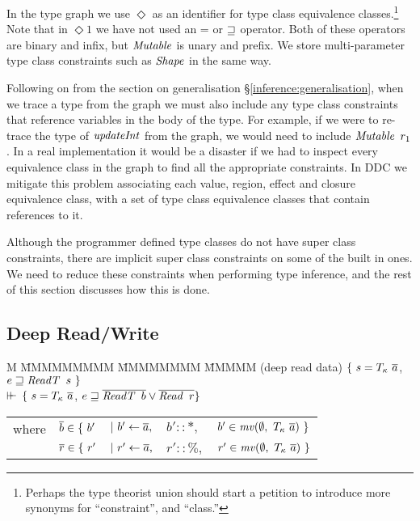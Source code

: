 In the type graph we use $\Diamond$ as an identifier for type class equivalence classes.\footnote{Perhaps the type theorist union should start a petition to introduce more synonyms for ``constraint'', and ``class.''} Note that in $\Diamond1$ we have not used an = or $\sqsupseteq$ operator. Both of these operators are binary and infix, but $\operatorname{\mathit{Mutable}}$ is unary and prefix. We store multi-parameter type class constraints such as $\operatorname{\mathit{Shape}}$ in the same way.

Following on from the section on generalisation \S\ref{inference:generalisation}, when we trace a type from the graph we must also include any type class constraints that reference variables in the body of the type. For example, if we were to re-trace the type of $\operatorname{\mathit{updateInt}}$ from the graph, we would need to include $\operatorname{\mathit{Mutable}} \ r_1$. In a real implementation it would be a disaster if we had to inspect every equivalence class in the graph to find all the appropriate constraints. In DDC we mitigate this problem associating each value, region, effect and closure equivalence class, with a set of type class equivalence classes that contain references to it.

Although the programmer defined type classes do not have super class constraints, there are implicit super class constraints on some of the built in ones. We need to reduce these constraints when performing type inference, and the rest of this section discusses how this is done.


\subsection{Deep Read/Write}

\begin{tabbing}
	M \= MMMMMMMMM \= MMMMMMMM \= MMMMM \kill
	\> (deep read data)	\> $\{ \ s = T_{\kappa} \ \overline{a}$, 
				\> $e \sqsupseteq \operatorname{\mathit{ReadT}} \ s \ \}$ 
	\\
	\> \qq \qq $\vdash\mkern-6mu\vdash$	\> $\{ \ s = T_{\kappa} \ \overline{a}$, 
				\> $e \sqsupseteq \overline{\operatorname{\mathit{ReadT}} \ b} \lor \overline{\operatorname{\mathit{Read}} \ r} \}$ 
	\\[1ex]
	\> \qq \qq	
		\begin{tabular}{lllll}
		where 	& $\ov{b} \in \{ \ b'$	
					& $| \ b'  \gets \overline{a},$
					& $b' :: *,$
					& $b' \in \operatorname{\mathit{mv}}(\emptyset, \ T_{\kappa} \ \overline{a}) \ \}$ \\
			& $\overline{r}    \in \{ \  r'$	
					& $| \ r'   \gets \overline{a},$
					& $r' :: \%,$ 
					& $r' \in \operatorname{\mathit{mv}}(\emptyset, \ T_{\kappa} \ \overline{a}) \ \}$ 
		\end{tabular}
\end{tabbing}

